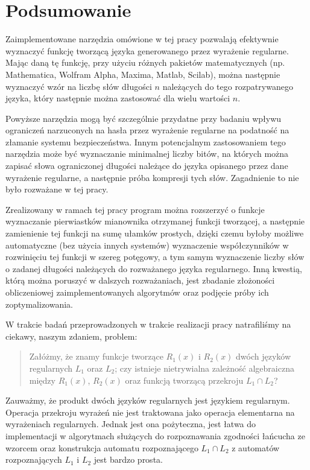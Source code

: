 
\chapter{Podsumowanie}

Zaimplementowane narzędzia omówione w tej pracy pozwalają efektywnie wyznaczyć funkcję tworzącą języka generowanego przez wyrażenie regularne. Mając daną tę funkcję, przy użyciu różnych pakietów matematycznych (np. Mathematica, Wolfram Alpha, Maxima, Matlab, Scilab), można następnie wyznaczyć wzór na liczbę słów długości $n$ należących do tego rozpatrywanego języka, który następnie można zastosować dla wielu wartości $n$. 

Powyższe narzędzia mogą być szczególnie przydatne przy badaniu wpływu ograniczeń narzuconych na hasła przez wyrażenie regularne na podatność na złamanie systemu bezpieczeństwa. Innym potencjalnym zastosowaniem tego narzędzia może być wyznaczanie minimalnej liczby bitów, na których można zapisać słowa ograniczonej długości należące do języka opisanego przez dane wyrażenie regularne, a następnie próba kompresji tych słów. Zagadnienie to nie było rozważane w tej pracy.

Zrealizowany w ramach tej pracy program można rozszerzyć o funkcje wyznaczanie pierwiastków mianownika otrzymanej funkcji tworzącej, a następnie zamienienie tej funkcji na sumę ułamków prostych, dzięki czemu byłoby możliwe automatyczne (bez użycia innych systemów) wyznaczenie współczynników w rozwinięciu tej funkcji w szereg potęgowy, a tym samym wyznaczenie liczby słów o zadanej długości należących do rozważanego języka regularnego. Inną kwestią, którą można poruszyć w dalszych rozważaniach, jest zbadanie złożoności obliczeniowej zaimplementowanych algorytmów oraz podjęcie próby ich zoptymalizowania.

W trakcie badań przeprowadzonych w trakcie realizacji pracy natrafiliśmy na ciekawy, naszym zdaniem, problem: 
\begin{quote}
Załóżmy, że znamy funkcje tworzące $R_1(x)$ i $R_2(x)$ dwóch języków regularnych $L_1$ oraz $L_2$; czy istnieje nietrywialna zależność algebraiczna między $R_1(x)$, $R_2(x)$ oraz funkcją tworzącą przekroju $L_1 \cap L_2$?
\end{quote}  
Zauważmy, że produkt dwóch języków regularnych jest językiem regularnym. Operacja przekroju wyrażeń nie jest traktowana jako operacja elementarna na wyrażeniach regularnych. Jednak jest ona pożyteczna, jest łatwa do implementacji w algorytmach służących do rozpoznawania zgodności łańcucha ze wzorcem oraz konstrukcja automatu rozpoznającego  $L_1 \cap L_2$ z automatów rozpoznających $L_1$ i $L_2$ jest bardzo prosta.